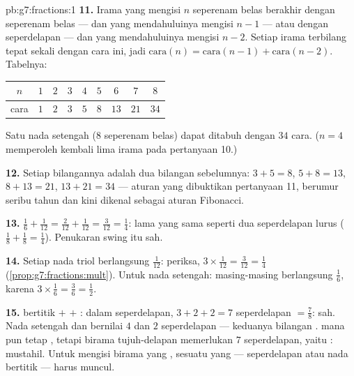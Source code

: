 \begin{solution}{pb:g7:fractions:1}
\textbf{11.} Irama yang mengisi $n$ seperenam belas berakhir dengan
seperenam belas --- dan yang mendahuluinya mengisi $n - 1$ --- atau
dengan seperdelapan --- dan yang mendahuluinya mengisi $n - 2$.
Setiap irama terbilang tepat sekali dengan cara ini, jadi
$\text{cara}(n) = \text{cara}(n-1) + \text{cara}(n-2)$. Tabelnya:
\begin{center}
\renewcommand{\arraystretch}{1.2}
\begin{tabular}{c|cccccccc}
$n$ & $1$ & $2$ & $3$ & $4$ & $5$ & $6$ & $7$ & $8$ \\
\hline
cara & $1$ & $2$ & $3$ & $5$ & $8$ & $13$ & $21$ & $34$ \\
\end{tabular}
\end{center}
Satu nada setengah ($8$ seperenam belas) dapat ditabuh dengan $34$ cara.
($n = 4$ memperoleh kembali lima irama pada pertanyaan 10.)

\textbf{12.} Setiap bilangannya adalah  dua bilangan
sebelumnya: $3 + 5 = 8$, $5 + 8 = 13$, $8 + 13 = 21$,
$13 + 21 = 34$ --- aturan yang dibuktikan pertanyaan 11, berumur
seribu tahun dan kini dikenal sebagai aturan Fibonacci.

\textbf{13.} $\frac16 + \frac{1}{12} = \frac{2}{12} +
\frac{1}{12} = \frac{3}{12} = \frac14$: lama yang sama seperti
dua seperdelapan lurus ($\frac18 + \frac18 = \frac14$). Penukaran
swing itu sah.

\textbf{14.} Setiap nada triol berlangsung $\frac{1}{12}$: periksa,
$3 \times \frac{1}{12} = \frac{3}{12} = \frac14$
(\cref{prop:g7:fractions:mult}). Untuk nada setengah: masing-masing
berlangsung $\frac16$, karena $3 \times \frac16 = \frac36 = \frac12$.

\textbf{15.}  bertitik $+$  $+$ : dalam
seperdelapan, $3 + 2 + 2 = 7$ seperdelapan $= \frac78$: sah. Nada
setengah dan  bernilai $4$ dan $2$ seperdelapan --- keduanya
bilangan \emph{}.   mana pun tetap ,
tetapi birama tujuh-delapan memerlukan $7$ seperdelapan, yaitu
: mustahil. Untuk mengisi birama yang , sesuatu
yang  --- seperdelapan atau nada bertitik --- harus muncul.

\end{solution}
